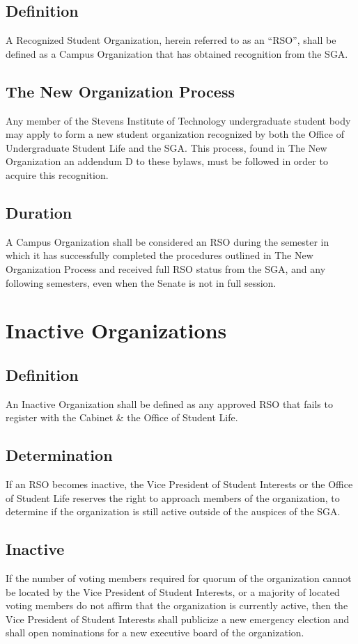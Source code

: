 \documentclass[12pt]{scrreprt}
\begin{document}
\subsection{Definition}
A Recognized Student Organization, herein referred to as an ``RSO'', shall be 
defined as a Campus Organization that has obtained recognition from the SGA.

\subsection{The New Organization Process}
Any member of the Stevens Institute of Technology undergraduate student
body may apply to form a new student organization recognized by both the Office of Undergraduate Student Life and the SGA. This process, found in The New Organization an addendum D to these bylaws, must be followed in order to acquire this recognition.

\subsection{Duration}
A Campus Organization shall be considered an RSO during the semester in which
it has successfully completed the procedures outlined in The New Organization Process and received full RSO status from the SGA, and any following semesters, even when the Senate is not in full session.

\section{Inactive Organizations}

\subsection{Definition}
An Inactive Organization shall be defined as any approved RSO that fails to 
register with the Cabinet \& the Office of Student Life.

\subsection{Determination}
If an RSO becomes inactive, the Vice President of Student Interests or the Office of Student Life reserves the right to approach members of the organization, to determine if the 
organization is still active outside of the auspices of the SGA.

\subsection{Inactive}
If the number of voting members required for quorum of the organization cannot 
be located by the Vice President of Student Interests, or a majority of located voting members do not affirm that the organization is currently active, then the Vice President of Student Interests shall publicize a new emergency election and shall open nominations for a new executive board of the organization.
\end{document}
